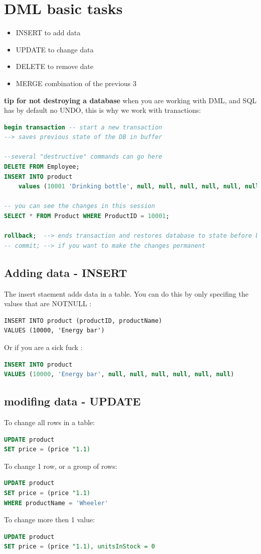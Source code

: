 \documentclass{report}
\begin{document}
	\section{DML basic tasks}
	\begin{itemize}
		\item INSERT to add data
		\item UPDATE to change data
		\item DELETE to remove date
		\item MERGE combination of the previous 3
	\end{itemize}

	\textbf{tip for not destroying a database}
	when you are working with DML, and SQL has by default no UNDO, this is why we work with tranactions: 
	\begin{lstlisting}[language=SQL]
begin transaction -- start a new transaction
--> saves previous state of the DB in buffer

--several "destructive" commands can go here
DELETE FROM Employee;
INSERT INTO product
	values (10001 'Drinking bottle', null, null, null, null, null, null);

-- you can see the changes in this session
SELECT * FROM Product WHERE ProductID = 10001;

rollback;  --> ends transaction and restores database to state before begin transaction
-- commit; --> if you want to make the changes permanent\end{lstlisting}
	\subsection{Adding data - INSERT}
	The insert staement adds data in a table. You can do this by only specifing the values that are NOTNULL : 
	\begin{lstlisting}
INSERT INTO product (productID, productName)
VALUES (10000, 'Energy bar')\end{lstlisting}
	Or if you are a sick fuck : 
	\begin{lstlisting}[language=SQL]
INSERT INTO product
VALUES (10000, 'Energy bar', null, null, null, null, null, null)\end{lstlisting}
	\subsection{modifing data - UPDATE}
	To change all rows in a table: 
	\begin{lstlisting}[language=SQL]
UPDATE product
SET price = (price "1.1)\end{lstlisting}
To change 1 row, or a group of rows:  
\begin{lstlisting}[language=SQL]
UPDATE product
SET price = (price "1.1)
WHERE productName = 'Wheeler'\end{lstlisting}
To change more then 1 value: 
\begin{lstlisting}[language=SQL]
UPDATE product
SET price = (price "1.1), unitsInStock = 0\end{lstlisting}
\end{document}
